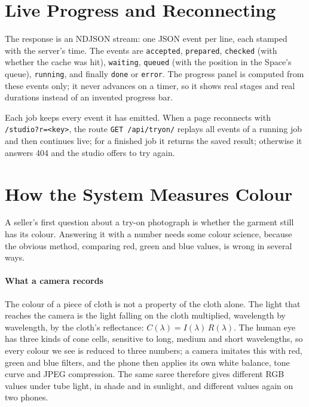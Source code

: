 \section{Live Progress and Reconnecting}

The response is an NDJSON stream: one JSON event per line, each stamped with the server's time. The events are \texttt{accepted}, \texttt{prepared}, \texttt{checked} (with whether the cache was hit), \texttt{waiting}, \texttt{queued} (with the position in the Space's queue), \texttt{running}, and finally \texttt{done} or \texttt{error}. The progress panel is computed from these events only; it never advances on a timer, so it shows real stages and real durations instead of an invented progress bar.

Each job keeps every event it has emitted. When a page reconnects with \texttt{/studio?r=<key>}, the route \texttt{GET\allowbreak{} /api/\allowbreak tryon/\allowbreak[key]} replays all events of a running job and then continues live; for a finished job it returns the saved result; otherwise it answers 404 and the studio offers to try again.

\section{How the System Measures Colour}
\label{sec:colour}

A seller's first question about a try-on photograph is whether the garment still has its colour. Answering it with a number needs some colour science, because the obvious method, comparing red, green and blue values, is wrong in several ways.

\paragraph{What a camera records} The colour of a piece of cloth is not a property of the cloth alone. The light that reaches the camera is the light falling on the cloth multiplied, wavelength by wavelength, by the cloth's reflectance: $C(\lambda) = I(\lambda)\,R(\lambda)$. The human eye has three kinds of cone cells, sensitive to long, medium and short wavelengths, so every colour we see is reduced to three numbers; a camera imitates this with red, green and blue filters, and the phone then applies its own white balance, tone curve and JPEG compression. The same saree therefore gives different RGB values under tube light, in shade and in sunlight, and different values again on two phones.

